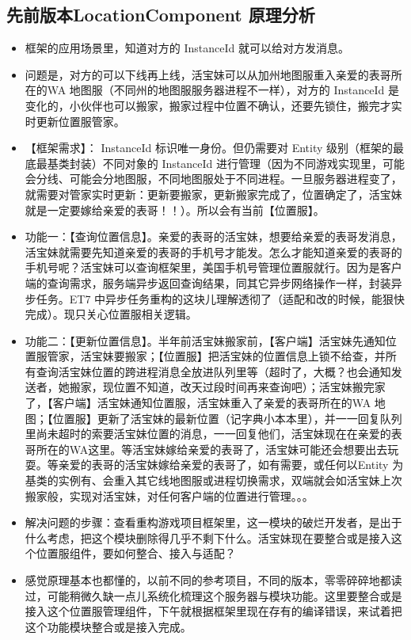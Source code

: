 \documentclass[9pt, b5paper]{article}
\begin{document}
\subsection{先前版本LocationComponent 原理分析}
\label{sec-5-1}
\begin{itemize}
\item 框架的应用场景里，知道对方的 InstanceId 就可以给对方发消息。
\item 问题是，对方的可以下线再上线，活宝妹可以从加州地图服重入亲爱的表哥所在的WA 地图服（不同州的地图服服务器进程不一样），对方的 InstanceId 是变化的，小伙伴也可以搬家，搬家过程中位置不确认，还要先锁住，搬完才实时更新位置服管家。
\item 【框架需求】： InstanceId 标识唯一身份。但仍需要对 Entity 级别（框架的最底最基类封装）不同对象的 InstanceId 进行管理（因为不同游戏实现里，可能会分线、可能会分地图服，不同地图服处于不同进程。一旦服务器进程变了，就需要对管家实时更新：更新要搬家，更新搬家完成了，位置确定了，活宝妹就是一定要嫁给亲爱的表哥！！）。所以会有当前【位置服】。
\item 功能一：【查询位置信息】。亲爱的表哥的活宝妹，想要给亲爱的表哥发消息，活宝妹就需要先知道亲爱的表哥的手机号才能发。怎么才能知道亲爱的表哥的手机号呢？活宝妹可以查询框架里，美国手机号管理位置服就行。因为是客户端的查询需求，服务端异步返回查询结果，同其它异步网络操作一样，封装异步任务。ET7 中异步任务重构的这块儿理解透彻了（适配和改的时候，能狠快完成）。现只关心位置服相关逻辑。
\item 功能二：【更新位置信息】。半年前活宝妹搬家前，【客户端】活宝妹先通知位置服管家，活宝妹要搬家；【位置服】把活宝妹的位置信息上锁不给查，并所有查询活宝妹位置的跨进程消息全放进队列里等（超时了，大概？也会通知发送者，她搬家，现位置不知道，改天过段时间再来查询吧）；活宝妹搬完家了，【客户端】活宝妹通知位置服，活宝妹重入了亲爱的表哥所在的WA 地图；【位置服】更新了活宝妹的最新位置（记字典小本本里），并一一回复队列里尚未超时的索要活宝妹位置的消息，一一回复他们，活宝妹现在在亲爱的表哥所在的WA这里。等活宝妹嫁给亲爱的表哥了，活宝妹可能还会想要出去玩耍。等亲爱的表哥的活宝妹嫁给亲爱的表哥了，如有需要，或任何以Entity 为基类的实例有、会重入其它线地图服或进程切换需求，双端就会如活宝妹上次搬家般，实现对活宝妹，对任何客户端的位置进行管理。。。
\item 解决问题的步骤：查看重构游戏项目框架里，这一模块的破烂开发者，是出于什么考虑，把这个模块删除得几乎不剩下什么。活宝妹现在要整合或是接入这个位置服组件，要如何整合、接入与适配？
\item 感觉原理基本也都懂的，以前不同的参考项目，不同的版本，零零碎碎地都读过，可能稍微久缺一点儿系统化梳理这个服务器与模块功能。这里要整合或是接入这个位置服管理组件，下午就根据框架里现在存有的编译错误，来试着把这个功能模块整合或是接入完成。

\end{itemize}
\end{document}
